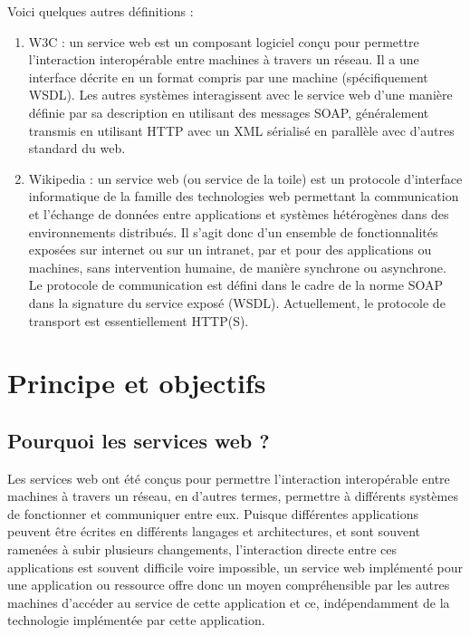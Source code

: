 Voici quelques autres définitions :
\begin{enumerate}
	\item W3C :
	      un service web est un composant logiciel conçu pour permettre l'interaction interopérable entre machines à travers un réseau. Il a une interface décrite en un format compris par une machine (spécifiquement WSDL). Les autres systèmes interagissent avec le service web d'une manière définie par sa description en utilisant des messages SOAP, généralement transmis en utilisant HTTP avec un XML sérialisé en parallèle avec d'autres standard du web\cite{W3}.
	\item Wikipedia : un service web (ou service de la toile) est un protocole d'interface informatique de la famille des technologies web permettant la communication et l'échange de données entre applications et systèmes hétérogènes dans des environnements distribués. Il s'agit donc d'un ensemble de fonctionnalités exposées sur internet ou sur un intranet, par et pour des applications ou machines, sans intervention humaine, de manière synchrone ou asynchrone. Le protocole de communication est défini dans le cadre de la norme SOAP dans la signature du service exposé (WSDL). Actuellement, le protocole de transport est essentiellement HTTP(S).
\end{enumerate}

\section{Principe et objectifs}
\subsection{Pourquoi les services web ?}
Les services web ont été conçus pour permettre l'interaction interopérable entre machines à travers un réseau, en d'autres termes, permettre à différents systèmes de fonctionner et communiquer entre eux.\newline
Puisque différentes applications peuvent être écrites en différents langages et architectures, et sont souvent ramenées à subir plusieurs changements, l’interaction directe entre ces applications est souvent difficile voire impossible, un service web implémenté pour une application ou ressource offre donc un moyen compréhensible par les autres machines d'accéder au service de cette application et ce, indépendamment de la technologie implémentée par cette application\cite{refTutorialPointsWS}.

